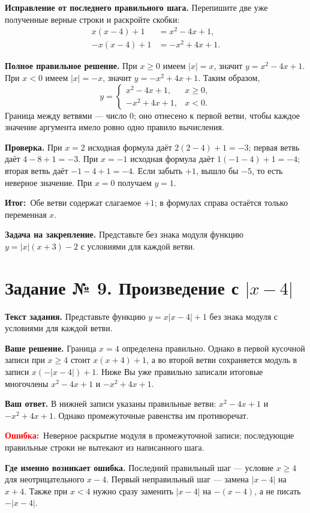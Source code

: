 \documentclass[12pt,a4paper]{article}
\newcommand{\err}{\textcolor{red}{\textbf{Ошибка:}}}
\newcommand{\outcome}{\textcolor{teal!60!black}{\textbf{Итог:}}}
\begin{document}
\textbf{Исправление от последнего правильного шага.} Перепишите две уже полученные верные строки и раскройте скобки:
\[
\begin{aligned}
x(x-4)+1&=x^2-4x+1,\\
-x(x-4)+1&=-x^2+4x+1.
\end{aligned}
\]

\textbf{Полное правильное решение.} При $x\geqslant0$ имеем $|x|=x$, значит $y=x^2-4x+1$. При $x<0$ имеем $|x|=-x$, значит $y=-x^2+4x+1$. Таким образом,
\[
\boxed{y=\begin{cases}
x^2-4x+1,&x\geqslant0,\\
-x^2+4x+1,&x<0.
\end{cases}}
\]
Граница между ветвями --- число $0$; оно отнесено к первой ветви, чтобы каждое значение аргумента имело ровно одно правило вычисления.

\textbf{Проверка.} При $x=2$ исходная формула даёт $2(2-4)+1=-3$; первая ветвь даёт $4-8+1=-3$. При $x=-1$ исходная формула даёт $1(-1-4)+1=-4$; вторая ветвь даёт $-1-4+1=-4$. Если забыть $+1$, вышло бы $-5$, то есть неверное значение. При $x=0$ получаем $y=1$.

\outcome\ Обе ветви содержат слагаемое $+1$; в формулах справа остаётся только переменная $x$.

\textbf{Задача на закрепление.} Представьте без знака модуля функцию $y=|x|(x+3)-2$ с условиями для каждой ветви.

\clearpage
{}\label{task:9}
\section*{Задание № 9. Произведение с $|x-4|$}
\textbf{Текст задания.} Представьте функцию $y=x|x-4|+1$ без знака модуля с условиями для каждой ветви.

\textbf{Ваше решение.} Граница $x=4$ определена правильно. Однако в первой кусочной записи при $x\geqslant4$ стоит $x(x+4)+1$, а во второй ветви сохраняется модуль в записи $x(-|x-4|)+1$. Ниже Вы уже правильно записали итоговые многочлены $x^2-4x+1$ и $-x^2+4x+1$.

\textbf{Ваш ответ.} В нижней записи указаны правильные ветви: $x^2-4x+1$ и $-x^2+4x+1$. Однако промежуточные равенства им противоречат.

\err\ Неверное раскрытие модуля в промежуточной записи; последующие правильные строки не вытекают из написанного шага.

\textbf{Где именно возникает ошибка.} Последний правильный шаг --- условие $x\geqslant4$ для неотрицательного $x-4$. Первый неправильный шаг --- замена $|x-4|$ на $x+4$. Также при $x<4$ нужно сразу заменить $|x-4|$ на $-(x-4)$, а не писать $-|x-4|$.
\end{document}
